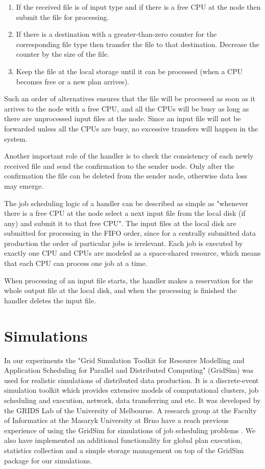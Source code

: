 \documentclass{svjour3}                     %
\begin{document}
\begin{enumerate}
\item If the received file is of input type and if there is a free CPU at the node then submit the file for processing.
\item If there is a destination with a greater-than-zero counter for the corresponding file type then transfer the file to that destination. Decrease the counter by the size of the file.
\item Keep the file at the local storage until it can be processed (when a CPU becomes free  or a new plan arrives).
\end{enumerate}
Such an order of alternatives ensures that the file will be processed as soon as it arrives to the node with a free CPU, and all the CPUs will be busy as long as there are unprocessed input files at the node. Since an input file will not be forwarded unless all the CPUs are busy, no excessive transfers will happen in the system.

Another important role of the handler is to check the consistency of each newly received file and send the confirmation to the sender node. Only after the confirmation the file can be deleted from the sender node, otherwise data loss may emerge. 

The job scheduling logic of a handler can be described as simple as "whenever there is a free CPU at the node select a next input file from the local disk (if any) and submit it to that free CPU". The input files at the local disk are submitted for processing in the FIFO order, since for a centrally submitted data production the order of particular jobs is irrelevant. Each job is executed by exactly one CPU and CPUs are modeled as a space-shared resource, which means that each CPU can process one job at a time.

When processing of an input file starts, the handler makes a reservation for the whole output file at the local disk, and when the processing is finished the handler deletes the input file.

\section{Simulations}
\label{simulations}
In our experiments the "Grid Simulation Toolkit for Resource Modelling and Application Scheduling for Parallel and Distributed Computing" (GridSim) \cite{GridSim} was used for realistic simulations of distributed data production. It is a discrete-event simulation toolkit which provides extensive models of computational clusters, job scheduling and execution, network, data transferring and etc. It was developed by the GRIDS Lab of the University of Melbourne. A research group at the Faculty of Informatics at the Masaryk University at Brno have a reach previous experience of using the GridSim for simulations of job scheduling problems \cite{alea2}.
We also have implemented an additional functionality for global plan execution, statistics collection and a simple storage management   on top of the GridSim package for our simulations.
\end{document}
